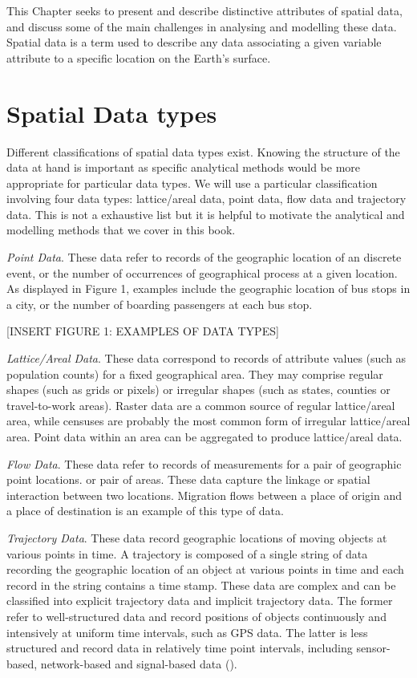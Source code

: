 \documentclass[
]{book}
\begin{document}
This Chapter seeks to present and describe distinctive attributes of spatial data, and discuss some of the main challenges in analysing and modelling these data. Spatial data is a term used to describe any data associating a given variable attribute to a specific location on the Earth's surface.

\hypertarget{spatial-data-types}{%
\section{Spatial Data types}\label{spatial-data-types}}

Different classifications of spatial data types exist. Knowing the structure of the data at hand is important as specific analytical methods would be more appropriate for particular data types. We will use a particular classification involving four data types: lattice/areal data, point data, flow data and trajectory data. This is not a exhaustive list but it is helpful to motivate the analytical and modelling methods that we cover in this book.

\emph{Point Data}. These data refer to records of the geographic location of an discrete event, or the number of occurrences of geographical process at a given location. As displayed in Figure 1, examples include the geographic location of bus stops in a city, or the number of boarding passengers at each bus stop.

{[}INSERT FIGURE 1: EXAMPLES OF DATA TYPES{]}

\emph{Lattice/Areal Data}. These data correspond to records of attribute values (such as population counts) for a fixed geographical area. They may comprise regular shapes (such as grids or pixels) or irregular shapes (such as states, counties or travel-to-work areas). Raster data are a common source of regular lattice/areal area, while censuses are probably the most common form of irregular lattice/areal area. Point data within an area can be aggregated to produce lattice/areal data.

\emph{Flow Data}. These data refer to records of measurements for a pair of geographic point locations. or pair of areas. These data capture the linkage or spatial interaction between two locations. Migration flows between a place of origin and a place of destination is an example of this type of data.

\emph{Trajectory Data}. These data record geographic locations of moving objects at various points in time. A trajectory is composed of a single string of data recording the geographic location of an object at various points in time and each record in the string contains a time stamp. These data are complex and can be classified into explicit trajectory data and implicit trajectory data. The former refer to well-structured data and record positions of objects continuously and intensively at uniform time intervals, such as GPS data. The latter is less structured and record data in relatively time point intervals, including sensor-based, network-based and signal-based data (\citet{kong2018big}).
\end{document}
